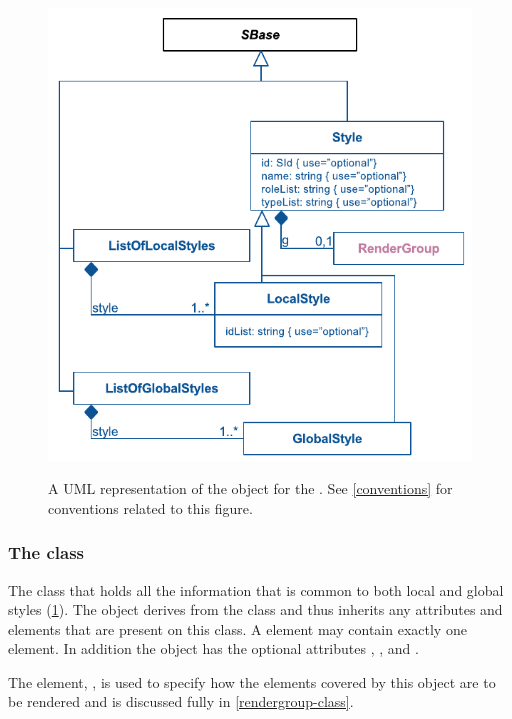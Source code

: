 \begin{figure}[!ht]
  \centering
  \includegraphics{images/render-style-uml}\\
  \caption{A UML representation of the \Style object for the \RenderPackage.
	See \ref{conventions} for conventions related to this figure. }
  \label{fig:style_render_uml}
\end{figure}
\subsubsection{The  class}
\label{style-class}

The \Style class that holds all the information that is common to both local and global styles (\ref{fig:style_render_uml}). The \Style object derives from the \SBase class and thus inherits any
attributes and elements that are present on this class.
A \Style element may contain exactly one \RenderGroup element.
In addition the \Style object has the optional attributes , ,  and .

The \RenderGroup element, , is used to specify how the elements covered by this \Style object are to be rendered and is discussed fully in \ref{rendergroup-class}. 

